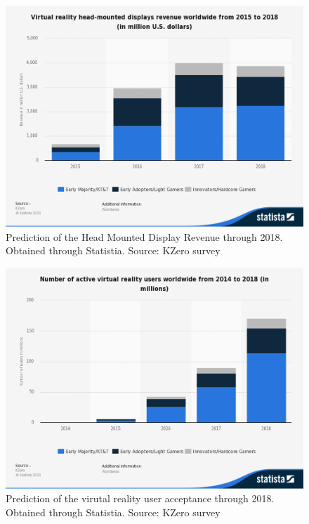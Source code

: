 \documentclass[a4paper,10pt]{article}
\begin{document}
\begin{figure}[H]
	\centerline{\includegraphics[scale = 0.3]{statMon.png}}
	\caption{Prediction of the Head Mounted Display Revenue through 2018.  Obtained through Statistia.  Source: KZero survey}
	\label{fig:moneyStats}
\end{figure}

\begin{figure}[H]
	\centerline{\includegraphics[scale = 0.23]{statsUsers.png}}
	\caption{Prediction of the virutal reality user acceptance through 2018.  Obtained through Statistia.  Source: KZero survey}
	\label{fig:userStats}
\end{figure}
\end{document}
